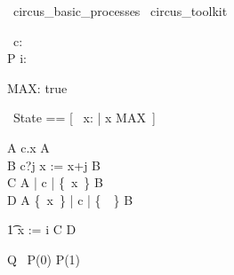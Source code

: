 

\begin{zsection}
  \SECTION\ circus\_basic\_processes \parents\ circus\_toolkit
\end{zsection}

\begin{circus}
    \circchannel\ c: \nat \\
    \circprocess P \circdef i: \nat \circspot \circbegin
\end{circus}

\begin{axdef}
     MAX: \nat
\where
     true
\end{axdef}

\begin{circusaction}
    \circstate\ State == [~ x: \nat | x \leq MAX~]
\end{circusaction}

\begin{circusaction}
     A \circdef c.x \then A \\
     B \circdef c?j \then x := x+j \circseq B \\
     C \circdef A \lpar \emptyset | \lchanset c \rchanset | \{~x~\} \rpar B \\
     D \circdef A \lpar \{~x~\} | \lchanset c \rchanset | \{~~\} \rpar B
\end{circusaction}

\begin{circusaction}
    \t1 \circspot x := i \circseq C \circseq D
\end{circusaction}

\begin{circus}
    \circend
\end{circus}

\begin{circus}
     \circprocess Q \circdef\ P(0) \extchoice P(1)
\end{circus}
